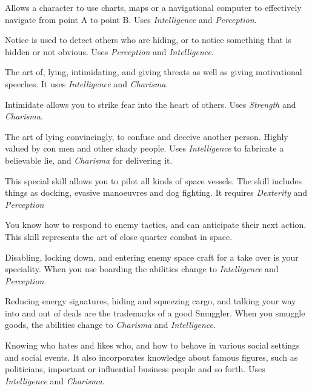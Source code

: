 \begin{description}
   Allows a character to use charts, maps or a navigational
  computer to effectively navigate from point A to point B. Uses
  \emph{Intelligence} and \emph{Perception}.

   Notice is used to detect others who are hiding, or to notice
  something that is hidden or not obvious. Uses \emph{Perception} and
  \emph{Intelligence}.

   The art of, lying, intimidating, and giving threats as well
  as giving motivational speeches. It uses \emph{Intelligence} and \emph{Charisma}.

   Intimidate allows you to strike
  fear into the heart of others. Uses \emph{Strength} and \emph{Charisma}.

   The art of lying convincingly,
  to confuse and deceive another person. Highly valued by con men and other
  shady people. Uses \emph{Intelligence} to fabricate a believable lie, and
  \emph{Charisma} for delivering it.

   This special skill allows you to pilot all
  kinds of space vessels. The skill includes things as docking, evasive
  manoeuvres and dog fighting. It requires \emph{Dexterity} and
  \emph{Perception}

   You know how to respond to
  enemy tactics, and can anticipate their next action. This skill represents the
  art of close quarter combat in space.

   Disabling, locking down, and
  entering enemy space craft for a take over is your speciality. When you use
  boarding the abilities change to \emph{Intelligence} and \emph{Perception}.

   Reducing energy signatures,
  hiding and squeezing cargo, and talking your way into and out of deals are the
  trademarks of a good Smuggler. When you smuggle goods, the abilities change to
  \emph{Charisma} and \emph{Intelligence}.

   Knowing who hates and likes who, and how to behave in
  various social settings and social events. It also incorporates knowledge about
  famous figures, such as politicians, important or influential business people
  and so forth. Uses \emph{Intelligence} and \emph{Charisma}.


\end{description}
